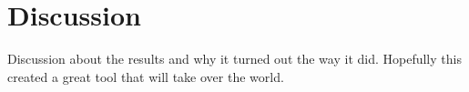 \section{Discussion}
Discussion about the results and why it turned out the way it did. Hopefully this created a great tool that will take over the world.
